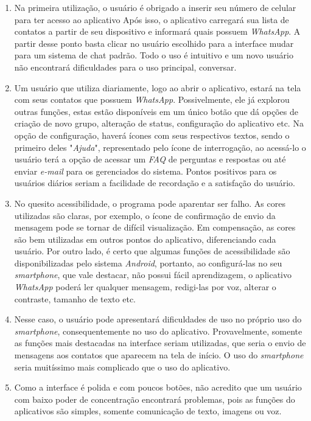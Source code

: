 \documentclass[
	article,			%
	11pt,				%
	oneside,			%
	a4paper,			%
	english,			%
	brazil,				%
	sumario=tradicional
	]{abntex2}
\begin{document}
\begin{enumerate}
	\item Na primeira utilização, o usuário é obrigado a inserir seu número de celular para ter acesso ao aplicativo Após isso, o aplicativo carregará sua lista de contatos a partir de seu dispositivo e informará quais possuem \textit{WhatsApp}. A partir desse ponto basta clicar no usuário escolhido para a interface mudar para um sistema de chat padrão. Todo o uso é intuitivo e um novo usuário não encontrará dificuldades para o uso principal, conversar.
	
	\item Um usuário que utiliza diariamente, logo ao abrir o aplicativo, estará na tela com seus contatos que possuem \textit{WhatsApp}. Possivelmente, ele já explorou outras funções, estas estão disponíveis em um único botão que dá opções de criação de novo grupo, alteração de status, configuração do aplicativo etc. Na opção de configuração, haverá ícones com seus respectivos textos, sendo o primeiro deles "\textit{Ajuda}", representado pelo ícone de interrogação, ao acessá-lo o usuário terá a opção de acessar um \textit{FAQ} de perguntas e respostas ou até enviar \textit{e-mail} para os gerenciados do sistema. Pontos positivos para os usuários diários seriam a facilidade de recordação e a satisfação do usuário.
	
	\item No quesito acessibilidade, o programa pode aparentar ser falho. As cores utilizadas são claras, por exemplo, o ícone de confirmação de envio da mensagem pode se tornar de difícil visualização. Em compensação, as cores são bem utilizadas em outros pontos do aplicativo, diferenciando cada usuário. Por outro lado, é certo que algumas funções de acessibilidade são disponibilizadas pelo sistema \textit{Android}, portanto, ao configurá-las no seu \textit{smartphone}, que vale destacar, não possui fácil aprendizagem, o aplicativo \textit{WhatsApp} poderá ler qualquer mensagem, redigi-las por voz, alterar o contraste, tamanho de texto etc.
	
	\item Nesse caso, o usuário pode apresentará dificuldades de uso no próprio uso do \textit{smartphone}, consequentemente no uso do aplicativo. Provavelmente, somente as funções mais destacadas na interface seriam utilizadas, que seria o envio de mensagens aos contatos que aparecem na tela de início. O uso do \textit{smartphone} seria muitíssimo mais complicado que o uso do aplicativo.
	
	\item Como a interface é polida e com poucos botões, não acredito que um usuário com baixo poder de concentração encontrará problemas, pois as funções do aplicativos são simples, somente comunicação de texto, imagens ou voz.
	

\end{enumerate}
\end{document}
